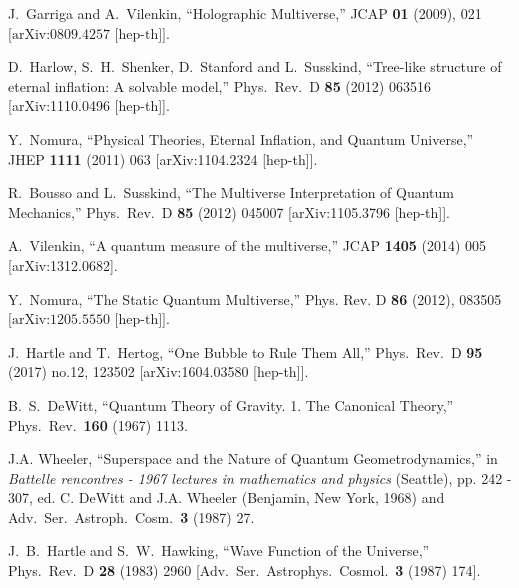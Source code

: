 \documentclass[12pt]{article}
\numberwithin{equation}{section}
\begin{document}
\begin{thebibliography}{999}
J.~Garriga and A.~Vilenkin,
``Holographic Multiverse,''
JCAP \textbf{01} (2009), 021\\
$\mbox{[arXiv:0809.4257 [hep-th]]. }$

  D.~Harlow, S.~H.~Shenker, D.~Stanford and L.~Susskind,
  ``Tree-like structure of eternal inflation: A solvable model,''
  Phys.\ Rev.\ D {\bf 85} (2012) 063516
  [arXiv:1110.0496 [hep-th]].  
  
  Y.~Nomura,
  ``Physical Theories, Eternal Inflation, and Quantum Universe,''
  JHEP {\bf 1111} (2011) 063
  [arXiv:1104.2324 [hep-th]].
    
  R.~Bousso and L.~Susskind,
  ``The Multiverse Interpretation of Quantum Mechanics,''
  Phys.\ Rev.\ D {\bf 85} (2012) 045007
  [arXiv:1105.3796 [hep-th]].

  A.~Vilenkin, ``A quantum measure of the multiverse,''
  JCAP {\bf 1405} (2014) 005 \\{} 
  [arXiv:1312.0682].
  
Y.~Nomura,
``The Static Quantum Multiverse,''
Phys. Rev. D \textbf{86} (2012), 083505\\
$\mbox{[arXiv:1205.5550 [hep-th]].}$ 
 
  J.~Hartle and T.~Hertog,
  ``One Bubble to Rule Them All,''
  Phys.\ Rev.\ D {\bf 95} (2017) no.12,  123502
  [arXiv:1604.03580 [hep-th]].
  
  B.~S.~DeWitt,
  ``Quantum Theory of Gravity. 1. The Canonical Theory,''
  Phys.\ Rev.\  {\bf 160} (1967) 1113.

  J.A. $\!$Wheeler,
  ``Superspace and the Nature of Quantum Geometrodynamics,'' $\!$in {\it Battelle ren\-contres - 1967 lectures in mathematics and physics} (Seattle),
pp. 242 - 307, ed. C. DeWitt and J.A. Wheeler (Benjamin, New York, 1968) and Adv.\ Ser.\ Astroph.\ Cosm.\  {\bf 3} (1987) 27.

  J.~B.~Hartle and S.~W.~Hawking,
  ``Wave Function of the Universe,''
  Phys.\ Rev.\ D {\bf 28} (1983) 2960
   [Adv.\ Ser.\ Astrophys.\ Cosmol.\  {\bf 3} (1987) 174].
 

\end{thebibliography}
\end{document}
